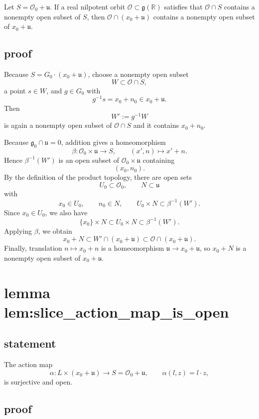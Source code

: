 \documentclass[
]{article}
\begin{document}
Let \(S=\mathcal O_0+\mathfrak u\). If a real nilpotent orbit
\(\mathcal O\subset \mathfrak g(\mathbb R)\) satisfies that
\(\mathcal O\cap S\) contains a nonempty open subset of \(S\), then
\(\mathcal O\cap(x_0+\mathfrak u)\) contains a nonempty open subset of
\(x_0+\mathfrak u\).

\subsection{proof}\label{proof-3}

Because \(S=G_0\cdot(x_0+\mathfrak u)\), choose a nonempty open subset
\[
W\subset \mathcal O\cap S,
\] a point \(s\in W\), and \(g\in G_0\) with \[
g^{-1}s=x_0+n_0\in x_0+\mathfrak u.
\] Then \[
W':=g^{-1}W
\] is again a nonempty open subset of \(\mathcal O\cap S\) and it
contains \(x_0+n_0\).

Because \(\mathfrak g_0\cap \mathfrak u=0\), addition gives a
homeomorphism \[
\beta:\mathcal O_0\times \mathfrak u\longrightarrow S,\qquad (x',n)\mapsto x'+n.
\] Hence \(\beta^{-1}(W')\) is an open subset of
\(\mathcal O_0\times \mathfrak u\) containing \[
(x_0,n_0).
\] By the definition of the product topology, there are open sets \[
U_0\subset \mathcal O_0,\qquad N\subset \mathfrak u
\] with \[
x_0\in U_0,\qquad n_0\in N,\qquad U_0\times N\subset \beta^{-1}(W').
\] Since \(x_0\in U_0\), we also have \[
\{x_0\}\times N\subset U_0\times N\subset \beta^{-1}(W').
\] Applying \(\beta\), we obtain \[
x_0+N\subset W'\cap(x_0+\mathfrak u)\subset \mathcal O\cap(x_0+\mathfrak u).
\] Finally, translation \(n\mapsto x_0+n\) is a homeomorphism
\(\mathfrak u\to x_0+\mathfrak u\), so \(x_0+N\) is a nonempty open
subset of \(x_0+\mathfrak u\).

\section{lemma
lem:slice\_action\_map\_is\_open}\label{lemma-lemslice_action_map_is_open}

\subsection{statement}\label{statement-4}

The action map \[
\alpha:L\times (x_0+\mathfrak u)\longrightarrow S=\mathcal O_0+\mathfrak u,
\qquad
\alpha(l,z)=l\cdot z,
\] is surjective and open.

\subsection{proof}\label{proof-4}
\end{document}
